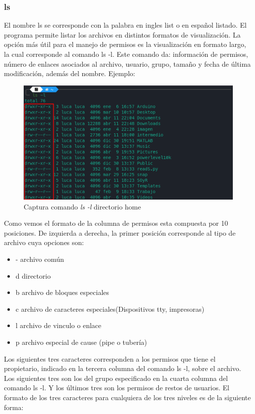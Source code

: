\documentclass[12pt,a4paper]{article} %
\begin{document}
	\subsubsection{ls}
	El nombre ls se corresponde con la palabra en ingles list o en español listado. El programa permite listar los archivos en distintos formatos de visualización. La opción más útil para el manejo de permisos es la visualización en formato largo, la cual corresponde al comando ls -l.  Este comando da: información de permisos, número de enlaces asociados al archivo, usuario, grupo, tamaño y fecha de última modificación, además del nombre. Ejemplo:\par
	\begin{figure}[h]
		\includegraphics[scale=1]{ls_capture}
		\caption{Captura comando \textit{ls -l} directorio home}
	\end{figure}
	Como vemos el formato de la columna de permisos esta compuesta por 10 posiciones. De izquierda a derecha, la primer posición corresponde al tipo de archivo cuya opciones son:
	\begin{itemize}
		\item - archivo común
		\item d directorio
		\item b archivo de bloques especiales
		\item c archivo de caracteres especiales(Dispositivos tty, impresoras)
		\item l archivo de vinculo o enlace
		\item p archivo especial de cause (pipe o tubería)
	\end{itemize}
	Los siguientes tres caracteres corresponden a los permisos que tiene el propietario, indicado en la tercera columna del comando ls -l, sobre el archivo. Los siguientes tres son los del grupo especificado en la cuarta columna del comando ls -l. Y los últimos tres son los permisos de restos de usuarios. El formato de los tres caracteres para cualquiera de los tres niveles es de la siguiente forma:
\end{document}
